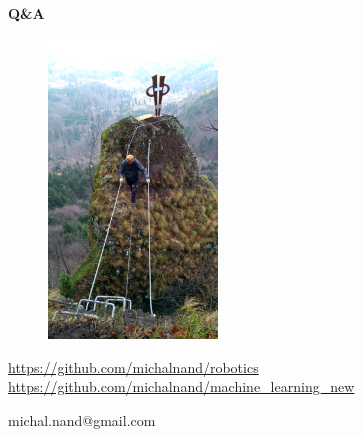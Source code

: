 \documentclass[xcolor=dvipsnames]{beamer}
\begin{document}
\begin{frame}{\bf Q\&A}

\begin{figure}[ht]
\begin{center}
\begin{minipage}{0.8\linewidth}
\begin{center}
 \includegraphics[width=0.4\textwidth]{../pictures/me2.jpg}
\end{center}
\end{minipage}
\end{center}
\end{figure}

\url{https://github.com/michalnand/robotics}
\url{https://github.com/michalnand/machine\_learning\_new}

\centerline{michal.nand@gmail.com}

\end{frame}
\end{document}
